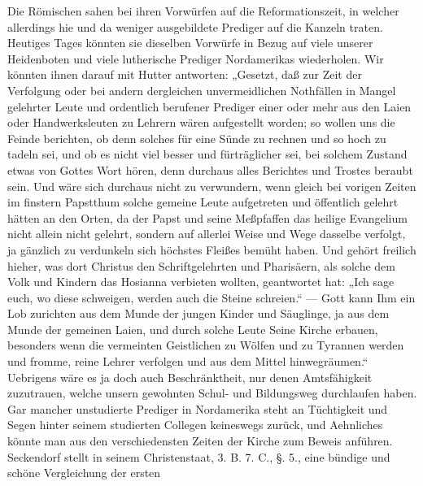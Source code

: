 Die Römischen sahen bei ihren Vorwürfen auf die Reformationszeit, in welcher allerdings hie und da weniger ausgebildete Prediger auf die Kanzeln traten. Heutiges Tages könnten sie dieselben Vorwürfe in Bezug auf viele unserer Heidenboten und viele lutherische Prediger Nordamerikas wiederholen. Wir könnten ihnen darauf mit Hutter antworten: „Gesetzt, daß zur Zeit der Verfolgung oder bei andern dergleichen unvermeidlichen Nothfällen in Mangel gelehrter Leute und ordentlich berufener Prediger einer oder mehr aus den Laien oder Handwerksleuten zu Lehrern wären aufgestellt worden; so wollen uns die Feinde
berichten, ob denn solches für eine Sünde zu rechnen und so hoch zu tadeln sei, und ob es nicht viel besser und fürträglicher sei, bei solchem Zustand etwas von Gottes Wort hören, denn durchaus alles Berichtes und Trostes beraubt sein. Und wäre sich durchaus nicht zu verwundern, wenn gleich bei vorigen Zeiten im finstern Papstthum solche gemeine Leute aufgetreten und öffentlich gelehrt hätten an den Orten, da der Papst und seine Meßpfaffen das heilige Evangelium nicht allein nicht gelehrt, sondern auf allerlei Weise und Wege dasselbe verfolgt, ja gänzlich zu verdunkeln sich höchstes Fleißes bemüht haben. Und gehört freilich hieher, was dort Christus den Schriftgelehrten und Pharisäern, als solche dem Volk und Kindern das Hosianna verbieten wollten, geantwortet hat: „Ich sage euch, wo diese schweigen, werden auch die Steine schreien.“ — Gott kann Ihm ein Lob zurichten aus dem Munde der jungen Kinder und Säuglinge, ja aus dem Munde der gemeinen Laien, und durch solche Leute Seine Kirche erbauen, besonders wenn die vermeinten Geistlichen zu Wölfen und zu Tyrannen werden und fromme, reine Lehrer verfolgen und aus dem Mittel hinwegräumen.“ Uebrigens wäre es ja doch auch Beschränktheit, nur denen Amtsfähigkeit zuzutrauen, welche unsern gewohnten Schul- und Bildungsweg durchlaufen haben. Gar mancher unstudierte Prediger in Nordamerika steht an Tüchtigkeit und Segen hinter seinem studierten Collegen keineswegs zurück, und Aehnliches könnte man aus den verschiedensten Zeiten der Kirche zum Beweis anführen. Seckendorf stellt in seinem Christenstaat, 3. B. 7. C., §. 5., eine bündige und schöne Vergleichung der ersten
